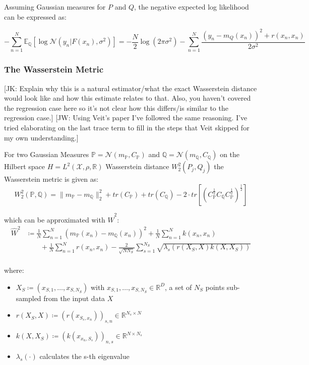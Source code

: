 \documentclass[twoside,11pt]{article}
\newcommand{\jk}[1]{{\color{blue} [JK: #1]}}
\newcommand{\jw}[1]{{\color{gray} [JW: #1]}}
\begin{document}
Assuming Gaussian measures for $P$ and $Q$, the negative expected log likelihood can be expressed as:

\[-\sum_{n=1}^N \mathbb{E}_{\mathbb{Q}}\left[ \log \mathcal{N}(y_n |F(x_n), \sigma^2)\right] = -\frac{N}{2} \log(2\pi \sigma^2) -\sum_{n=1}^N \frac{(y_n-m_Q(x_n))^2 + r(x_n, x_n)}{2\sigma^2} \]

\subsubsection{The Wasserstein Metric}\label{subsec:gwi-for-regression-wasserstein-metric}
%
\jk{Explain why this is a natural estimator/what the exact Wasserstein distance would look like and how this estimate relates to that. Also, you haven't covered the regression case here so it's not clear how this differs/is similar to the regression case.}
\jw{Using Veit's paper I've followed the same reasoning. I've tried elaborating on the last trace term to fill in the steps that Veit skipped for my own understanding.}
%

For two Gaussian Measures $\mathbb{P} = \mathcal{N}(m_{\mathbb{P}}, C_{\mathbb{P}})$ and $\mathbb{Q} = \mathcal{N}(m_{\mathbb{Q}}, C_{\mathbb{Q}})$ on the Hilbert space $H=L^2(\mathcal{X}, \rho, \mathbb{R})$ Wasserstein distance $W_2^2(P_j, Q_j)$ the Wasserstein metric is given as:
\[W_2^2(\mathbb{P}, \mathbb{Q}) = \|m_{\mathbb{P}} - m_{\mathbb{Q}}\|_2^2 + tr(C_{\mathbb{P}}) + tr(C_{\mathbb{Q}}) - 2 \cdot tr \left[ \left( C_{\mathbb{P}}^{\frac{1}{2}}C_{\mathbb{Q}}C_{\mathbb{P}}^{\frac{1}{2}}\right)^{\frac{1}{2}}\right]\]

which can be approximated with $\hat{W}^2$:
\[
\begin{split}
\hat{W}^2 & \coloneqq \frac{1}{N}\sum_{n=1}^N (m_{\mathbb{P}}(x_n)-m_{\mathbb{Q}}(x_n))^2 + \frac{1}{N}\sum_{n=1}^{N}k(x_n, x_n) \\
 &\qquad +\frac{1}{N}\sum_{n=1}^{N}r(x_n, x_n) - \frac{2}{\sqrt {N N_S}}\sum_{s=1}^{N_S}\sqrt {\lambda_s(r(X_S, X)k(X, X_S))} \\
\end{split}
\]

where:
\begin{itemize}
    \item $X_S \coloneqq (x_{S, 1}, \dots, x_{S, N_S})$ with $x_{S, 1}, \dots, x_{S, N_S} \in \mathbb{R}^D$, a set of $N_S$ points sub-sampled from the input data $X$
    \item $r(X_S, X) \coloneqq \left(r(x_{S_s, x_n})\right)_{s, n} \in \mathbb{R}^{N_s \times N}$
    \item $k(X, X_S) \coloneqq \left(k(x_{x_n, S_s})\right)_{n, s} \in \mathbb{R}^{N \times N_s}$
    \item $\lambda_s(\cdot)$ calculates the s-th eigenvalue
\end{itemize}
\end{document}
